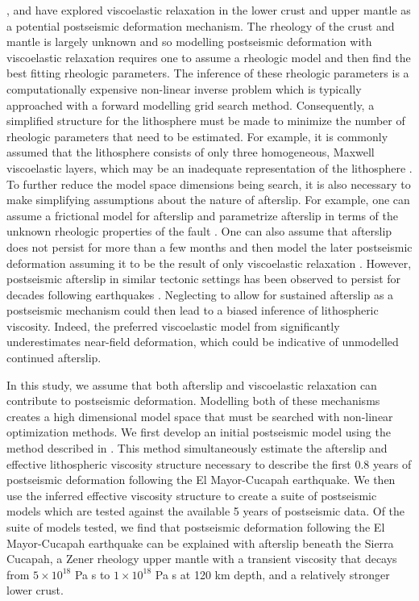 \documentclass[review]{elsarticle}
\begin{document}
\citet{Pollitz2012}, \citet{Rollins2015} and \citet{Spinler2015} have explored viscoelastic relaxation in the lower crust and upper mantle as a potential postseismic deformation mechanism. The rheology of the crust and mantle is largely unknown and so modelling postseismic deformation with viscoelastic relaxation requires one to assume a rheologic model and then find the best fitting rheologic parameters.  The inference of these rheologic parameters is a computationally expensive non-linear inverse problem which is typically approached with a forward modelling grid search method.  Consequently, a simplified structure for the lithosphere must be made to minimize the number of rheologic parameters that need to be estimated.  For example, it is commonly assumed that the lithosphere consists of only three homogeneous, Maxwell viscoelastic layers, which may be an inadequate representation of the lithosphere \citep[e.g.][]{Riva2009,Hines2013}. To further reduce the model space dimensions being search, it is also necessary to make simplifying assumptions about the nature of afterslip. For example, one can assume a frictional model for afterslip and parametrize afterslip in terms of the unknown rheologic properties of the fault \citep[e.g.][]{Johnson2009,Johnson2004}. One can also assume that afterslip does not persist for more than a few months and then model the later postseismic deformation assuming it to be the result of only viscoelastic relaxation \citep[e.g.][]{Pollitz2012,Spinler2015}. However, postseismic afterslip in similar tectonic settings has been observed to persist for decades following earthquakes \citep{Cakir2012,Cetin2014}. Neglecting to allow for sustained afterslip as a postseismic mechanism could then lead to a biased inference of lithospheric viscosity. Indeed, the preferred viscoelastic model from \citet{Pollitz2012} significantly underestimates near-field deformation, which could be indicative of unmodelled continued afterslip.

In this study, we assume that both afterslip and viscoelastic relaxation can contribute to postseismic deformation. Modelling both of these mechanisms creates a high dimensional model space that must be searched with non-linear optimization methods. We first develop an initial postseismic model using the method described in \citet{Hines2015}. This method simultaneously estimate the afterslip and effective lithospheric viscosity structure necessary to describe the first 0.8 years of postseismic deformation following the El Mayor-Cucapah earthquake.  We then use the inferred effective viscosity structure to create a suite of postseismic models which are tested against the available 5 years of postseismic data.  Of the suite of models tested, we find that postseismic deformation following the El Mayor-Cucapah earthquake can be explained with afterslip beneath the Sierra Cucapah, a Zener rheology upper mantle with a transient viscosity that decays from $5\times10^{18}$ Pa s to $1\times10^{18}$ Pa s at 120 km depth, and a relatively stronger lower crust. 
\end{document}
